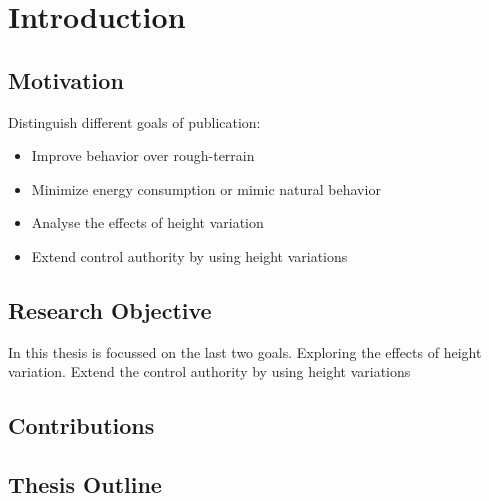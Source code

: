 %
\chapter{Introduction} \label{chap::intro}
\section{Motivation}
Distinguish different goals of publication: \cite{koolen2016balance}
\begin{itemize}
	\item Improve behavior over rough-terrain
	\item Minimize energy consumption or mimic natural behavior
	\item Analyse the effects of height variation
	\item Extend control authority by using height variations
\end{itemize}
\section{Research Objective}
In this thesis is focussed on the last two goals. Exploring the effects of height variation. Extend the control authority by using height variations
\section{Contributions}

\section{Thesis Outline}


